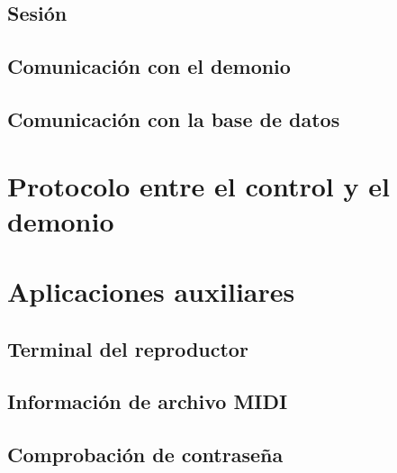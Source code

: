 \subsection{Sesión}

\subsection{Comunicación con el demonio}

\subsection{Comunicación con la base de datos}

\section{Protocolo entre el control y el demonio}

\section{Aplicaciones auxiliares}

\subsection{Terminal del reproductor}

\subsection{Información de archivo MIDI}

\subsection{Comprobación de contraseña}

\clearpage{\cleardoublepage}
\clearpage{\pagestyle{empty}\cleardoublepage}